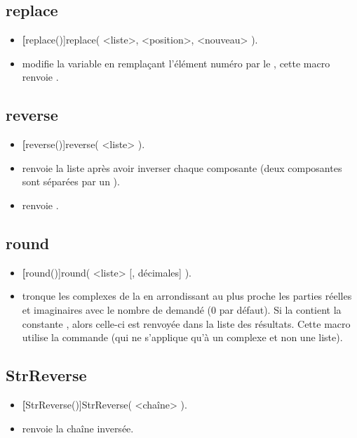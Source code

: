 \subsection{replace}
\begin{itemize}
 \item \util \textbf[replace()]{replace( <liste>, <position>, <nouveau> )}.
 \item \desc modifie la variable  en remplaçant l'élément numéro  par le , cette macro renvoie \Nil.
\end{itemize}

\subsection{reverse}
\begin{itemize}
 \item \util \textbf[reverse()]{reverse( <liste> )}.
 \item \desc renvoie la liste après avoir inverser chaque composante (deux composantes sont séparées par un \jump).
 \item \exem {} renvoie \res{[3,2,1,jump,6,5,4]}.
\end{itemize}

\subsection{round}

\begin{itemize}
 \item \util \textbf[round()]{round( <liste> [, décimales] )}.
 \item \desc tronque les complexes de la  en arrondissant au plus proche les parties réelles et imaginaires avec le nombre de  demandé (0 par défaut). Si la  contient la constante \jump, alors celle-ci est renvoyée dans la liste des résultats. Cette macro utilise la commande  (qui ne s'applique qu'à un complexe et non une liste).
\end{itemize}

\subsection{StrReverse}

\begin{itemize}
 \item \util \textbf[StrReverse()]{StrReverse( <chaîne> )}.
 \item \desc renvoie la chaîne inversée.
\end{itemize}


